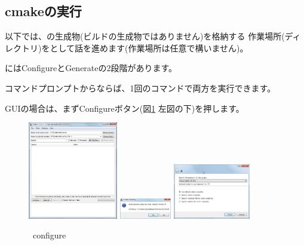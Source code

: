 \subsection{cmakeの実行}
\label{subsec:CmakeLibrary}

\noindent
以下では、\cmake の生成物(ビルドの生成物ではありません)を格納する
作業場所(ディレクトリ)を\build として話を進めます(作業場所は任意で構いません)。

\medskip
\cmake にはConfigureとGenerateの2段階があります。

\medskip
\begin{narrow}[15pt]
	コマンドプロンプトからならば、1回のコマンドで両方を実行できます。

	\bigskip
	GUIの場合は、まずConfigureボタン(図\ref{fig:CmakeConfigure} 左図の下)を押します。

	\begin{figure}[h]
	\begin{center}
	\includegraphics[width=0.35\textwidth]{fig/CmakeConfigure1.eps}
	\includegraphics[width=0.2\textwidth]{fig/CmakeConfigure2.eps}
	\includegraphics[width=0.3\textwidth]{fig/CmakeConfigure3.eps}
	\end{center}
	\caption{\cmake\ configure}
	\label{fig:CmakeConfigure}
	\end{figure}


\end{narrow}
